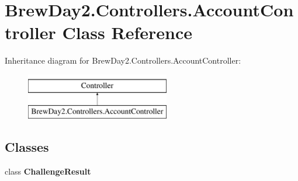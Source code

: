 \hypertarget{class_brew_day2_1_1_controllers_1_1_account_controller}{}\section{Brew\+Day2.\+Controllers.\+Account\+Controller Class Reference}
\label{class_brew_day2_1_1_controllers_1_1_account_controller}
Inheritance diagram for Brew\+Day2.\+Controllers.\+Account\+Controller\+:\begin{figure}[H]
\begin{center}
\leavevmode
\includegraphics[height=2.000000cm]{class_brew_day2_1_1_controllers_1_1_account_controller}
\end{center}
\end{figure}
\subsection*{Classes}
\begin{DoxyCompactItemize}
\item 
class {\bfseries Challenge\+Result}
\end{DoxyCompactItemize}
